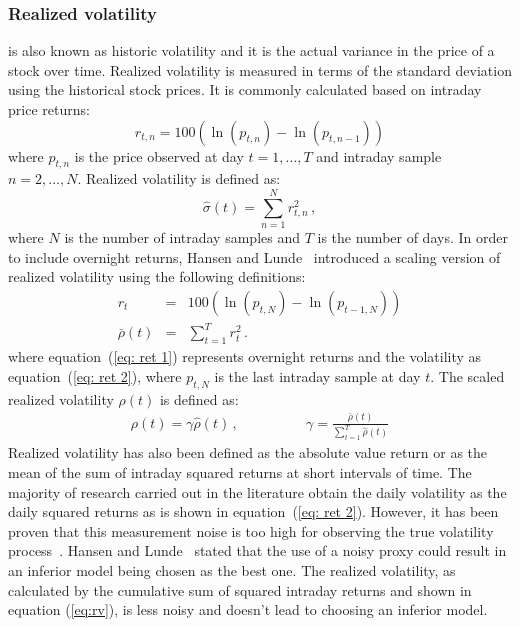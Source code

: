 \subsubsection{Realized volatility} is also known as historic volatility and
it is the actual variance in the price of a stock over time.
Realized volatility is measured in terms of the standard deviation
using the historical stock prices. It is commonly calculated based on
intraday price returns:
\begin{equation}
\label{eq:retintra}
r_{t,n}=100(\ln(p_{t,n}) - \ln(p_{t,n-1}))
\end{equation}
\noindent where $p_{t,n}$ is the price observed at day $t=1,\dots,T$ and
intraday sample $n=2,\dots,N$. Realized volatility is defined as:
\begin{equation}
\label{eq:rv}
    \hat{\sigma}(t) = \sum_{n=1}^N r_{t,n}^2 \, , 
\end{equation}
\noindent where $N$ is the number of intraday samples and $T$ is the
number of days. 
In order to include overnight returns, Hansen and
Lunde~\cite{hansen+lunde2005} introduced a scaling version of
realized volatility using the following definitions:
\begin{eqnarray}
r_{t}&=&100(\ln(p_{t,N}) - \ln(p_{t-1,N})) \label{eq: ret 1} \\
\bar{\rho}(t) &=& \sum_{t=1}^T r_{t}^2  \label{eq: ret 2} \, .
\end{eqnarray}
\noindent where equation~(\ref{eq: ret 1}) represents overnight 
returns and the volatility as 
equation~(\ref{eq: ret 2}), where $p_{t,N}$ is the last intraday 
sample at day $t$. The scaled realized volatility $\rho(t)$ is 
defined as:
\begin{eqnarray}
\label{eq:srv}
\rho(t) = \gamma \hat{\rho}(t) \, , \qquad & \qquad \gamma = \displaystyle \frac{\bar{\rho}(t)}{\displaystyle\sum_{t=1}^T \hat{\rho}(t)}
\end{eqnarray}
Realized volatility has also been defined as the absolute value return or as
the mean of the sum of intraday squared returns at short intervals of time. The
majority of research carried out in the literature obtain the daily volatility
as the daily squared returns as is shown in equation~(\ref{eq: ret 2}).
However, it has been proven that this measurement noise is too high for
observing the true volatility process~\cite{andersen+bollerslev1998}. Hansen
and Lunde~\cite{hansen+lunde2006} stated that the use of a noisy proxy could
result in an inferior model being chosen as the best one. The realized
volatility, as calculated by the cumulative sum of squared intraday returns and
shown in equation (\ref{eq:rv}), is less noisy and doesn't lead to choosing an
inferior model.   
